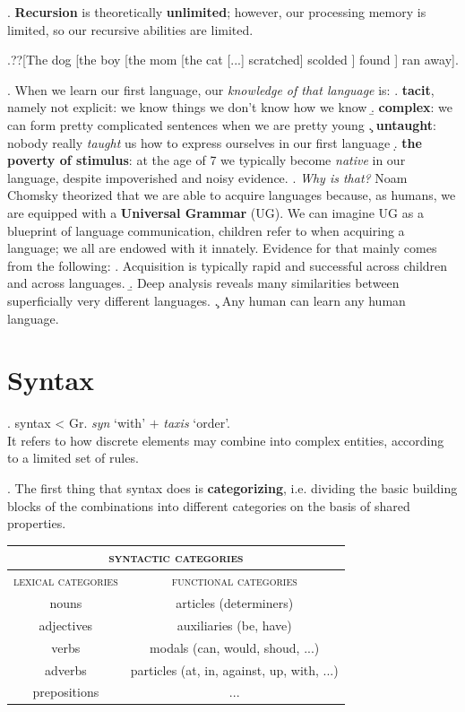 \documentclass[11pt, oneside]{article}   	%
\begin{document}
\ex. {\bfseries Recursion} is theoretically {\bfseries unlimited}; however, our processing memory is limited, so our recursive abilities are limited.

\ex.??{[}The dog [the boy [the mom [the cat [...] scratched] scolded ] found ] ran away].

\ex. When we learn our first language, our {\em knowledge of that language} is:
	\a. {\bfseries tacit}, namely not explicit: we know things we don't know how we know
	\b. {\bfseries complex}: we can form pretty complicated sentences when we are pretty young
	\c. {\bfseries untaught}: nobody really {\em taught} us how to express ourselves in our first language
	\d. {\bfseries the poverty of stimulus}: at the age of 7 we typically become {\em native} in our language, despite impoverished and noisy evidence.
	\z.
{\itshape Why is that?} Noam Chomsky theorized that we are able to acquire languages because, as humans, we are equipped with a {\bfseries Universal Grammar} (UG). We can imagine UG as a blueprint of language communication, children refer to when acquiring a language; we all are endowed with it innately. Evidence for that mainly comes from the following:
	\a.	Acquisition is typically rapid and successful across children and across languages.
	\b.	Deep analysis reveals many similarities between superficially very different languages.
	\c.	Any human can learn any human language.

\section{Syntax}

\ex. syntax < Gr. {\itshape syn} `with' $+$ {\itshape taxis} `order'. \\ 
It refers to how discrete elements may combine into complex entities, according to a limited set of rules. 

\ex. The first thing that syntax does is {\bfseries categorizing}, i.e. dividing the basic building blocks of the combinations into different categories on the basis of shared properties. 

\begin{center}
\begin{tabular}{| c || c |}\hline
\multicolumn{2}{|c|}{\bfseries \scshape syntactic categories} \\ \hline
{\scshape lexical categories}	&	{\scshape functional categories} \\ \hline
nouns	&	articles (determiners) \\ 
adjectives	&	auxiliaries (be, have)  \\
verbs	&  modals (can, would, shoud, ...)\\
adverbs	&  particles (at, in, against, up, with, ...) \\
prepositions &	... \\ \hline
\end{tabular}
\end{center}
\end{document}
